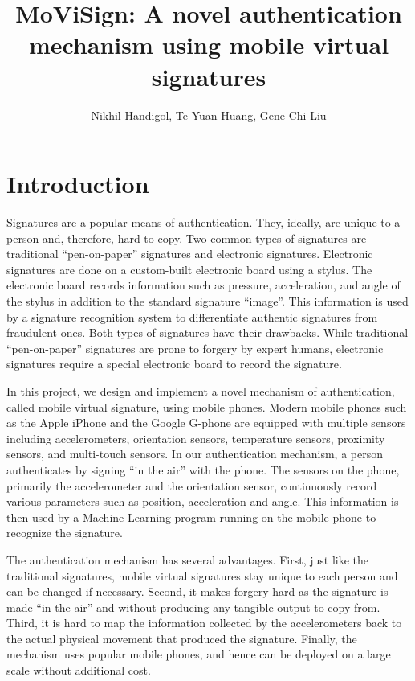 \documentclass[12pt]{article}
\title{MoViSign: A novel authentication mechanism using mobile virtual signatures}
\author{Nikhil Handigol, Te-Yuan Huang, Gene Chi Liu}
\date{}
\begin{document}
\maketitle


\section{Introduction}

Signatures are a popular means of authentication. They, ideally, are unique to a person and, therefore, hard to copy. Two common types of signatures are traditional ``pen-on-paper'' signatures and electronic signatures. Electronic signatures are done on a custom-built electronic board using a stylus. The electronic board records information such as pressure, acceleration, and angle of the stylus in addition to the standard signature ``image''. This information is used by a signature recognition system to differentiate authentic signatures from fraudulent ones. Both types of signatures have their drawbacks. While traditional ``pen-on-paper'' signatures are prone to forgery by expert humans, electronic signatures require a special electronic board to record the signature.

In this project, we design and implement a novel mechanism of authentication, called mobile virtual signature, using mobile phones. Modern mobile phones such as the Apple iPhone and the Google G-phone are equipped with multiple sensors including accelerometers, orientation sensors, temperature sensors, proximity sensors, and multi-touch sensors. In our authentication mechanism, a person authenticates by signing ``in the air'' with the phone. The sensors on the phone, primarily the accelerometer and the orientation sensor, continuously record various parameters such as position, acceleration and angle. This information is then used by a Machine Learning program running on the mobile phone to recognize the signature.

The authentication mechanism has several advantages. First, just like the traditional signatures, mobile virtual signatures stay unique to each person and can be changed if necessary. Second, it makes forgery hard as the signature is made ``in the air'' and without producing any tangible output to copy from. Third, it is hard to map the information collected by the accelerometers back to the actual physical movement that produced the signature. Finally, the mechanism uses popular mobile phones, and hence can be deployed on a large scale without additional cost.
\end{document}
